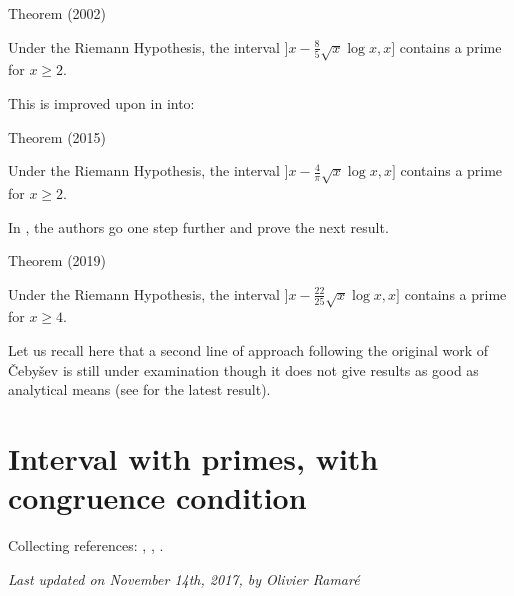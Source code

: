 \begin{thm}{Theorem (2002)}

Under the Riemann Hypothesis, the interval $\bigl]x-\tfrac85\sqrt{x}\log x,x\bigr]$
contains a prime for $x\ge2$.
\end{thm}

This is improved upon
in \cite{Dudek*15} into:
\begin{thm}{Theorem (2015)}

Under the Riemann Hypothesis, the interval $\bigl]x-\tfrac4{\pi}\sqrt{x}\log x,x\bigr]$
contains a prime for $x\ge2$.
\end{thm}


In \cite{Carneiro-Milinovich-Soundararajan*19}, the authors go one step further and prove the next result.
\begin{thm}{Theorem (2019)}

Under the Riemann Hypothesis, the interval $\bigl]x-\tfrac{22}{25}\sqrt{x}\log x,x\bigr]$
contains a prime for $x\ge4$.
\end{thm}



\par 
\par 

Let us recall here that a second line of approach following the original
work of \v Ceby\v sev is still under examination though it does not give
results as good
as analytical means (see
\cite{CostaPereira*89}
for the latest result).








\section{Interval with primes, with congruence condition}




Collecting references:
\cite{McCurley*84-2},
\cite{McCurley*84-3},
\cite{Kadiri*05-2}.

























  
\begin{flushright}\small\sl{}   Last updated on November 14th, 2017, by Olivier Ramar\'e
 \end{flushright}














